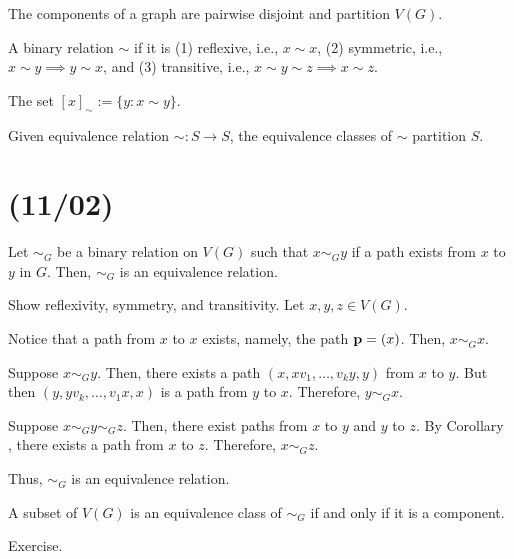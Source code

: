 \begin{theorem}
  The components of a graph are pairwise disjoint and partition $V(G)$.
\end{theorem}

\begin{defn}
  A binary relation $\sim$ if it is (1) reflexive, i.e., $x \sim x$,
  (2) symmetric, i.e., $x \sim y \implies y \sim x$,
  and (3) transitive, i.e., $x \sim y \sim z \implies x \sim z$.
\end{defn}

\begin{defn}
  The set $[x]_\sim := \{y : x \sim y\}$.
\end{defn}

\begin{prop}
  Given equivalence relation $\sim : S \to S$,
  the equivalence classes of $\sim$ partition $S$.
\end{prop}

\section{(11/02)}

\begin{theorem}\label{thm:patheq}
  Let $\sim_G$ be a binary relation on $V(G)$
  such that $x \sim_G y$ if a path exists from $x$ to $y$ in $G$.
  Then, $\sim_G$ is an equivalence relation.
\end{theorem}
\begin{prf}
  Show reflexivity, symmetry, and transitivity.
  Let $x,y,z \in V(G)$.

  Notice that a path from $x$ to $x$ exists, namely, the path $\vb p = (x)$.
  Then, $x \sim_G x$.

  Suppose $x \sim_G y$.
  Then, there exists a path $(x,xv_1,\dotsc,v_ky,y)$ from $x$ to $y$.
  But then $(y,yv_k,\dotsc,v_1x,x)$ is a path from $y$ to $x$.
  Therefore, $y \sim_G x$.

  Suppose $x \sim_G y \sim_G z$.
  Then, there exist paths from $x$ to $y$ and $y$ to $z$.
  By Corollary , there exists a path from $x$ to $z$.
  Therefore, $x \sim_G z$.

  Thus, $\sim_G$ is an equivalence relation.
\end{prf}
\begin{corollary}
  A subset of $V(G)$ is an equivalence class of $\sim_G$
  if and only if it is a component.
\end{corollary}
\begin{prf}
  Exercise.
\end{prf}

